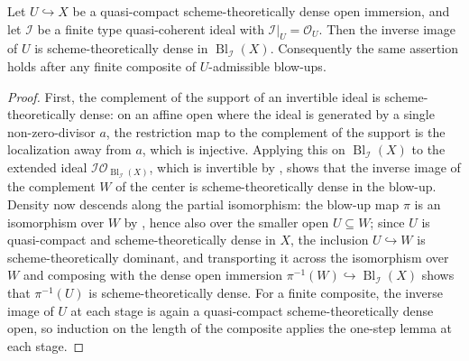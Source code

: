 \begin{lemma}
  \label{lemma:nagata-admissible-blowup-preserves-density}
  \leanok

  Let $U\hookrightarrow X$ be a quasi-compact scheme-theoretically dense open
  immersion, and let $\mathcal I$ be a finite type quasi-coherent ideal with
  $\mathcal I|_U=\mathcal O_U$.  Then the inverse image of $U$ is
  scheme-theoretically dense in $\operatorname{Bl}_{\mathcal I}(X)$.
  Consequently the same assertion holds after any finite composite of
  $U$-admissible blow-ups.
\end{lemma}

\begin{proof}
  \leanok
  First, the complement of the support of an invertible ideal is
  scheme-theoretically dense: on an affine open where the ideal is generated
  by a single non-zero-divisor $a$, the restriction map to the complement of
  the support is the localization away from $a$, which is injective.
  Applying this on $\operatorname{Bl}_{\mathcal I}(X)$ to the extended ideal
  $\mathcal I\mathcal O_{\operatorname{Bl}_{\mathcal I}(X)}$, which is
  invertible by , shows that the
  inverse image of the complement $W$ of the center is scheme-theoretically
  dense in the blow-up.  Density now descends along the partial isomorphism:
  the blow-up map $\pi$ is an isomorphism over $W$ by
  , hence also over the smaller
  open $U\subseteq W$; since $U$ is quasi-compact and scheme-theoretically
  dense in $X$, the inclusion $U\hookrightarrow W$ is scheme-theoretically
  dominant, and transporting it across the isomorphism over $W$ and composing
  with the dense open immersion $\pi^{-1}(W)\hookrightarrow
  \operatorname{Bl}_{\mathcal I}(X)$ shows that $\pi^{-1}(U)$ is
  scheme-theoretically dense.  For a finite composite, the inverse image of
  $U$ at each stage is again a quasi-compact scheme-theoretically dense open,
  so induction on the length of the composite applies the one-step lemma at
  each stage.
\end{proof}

